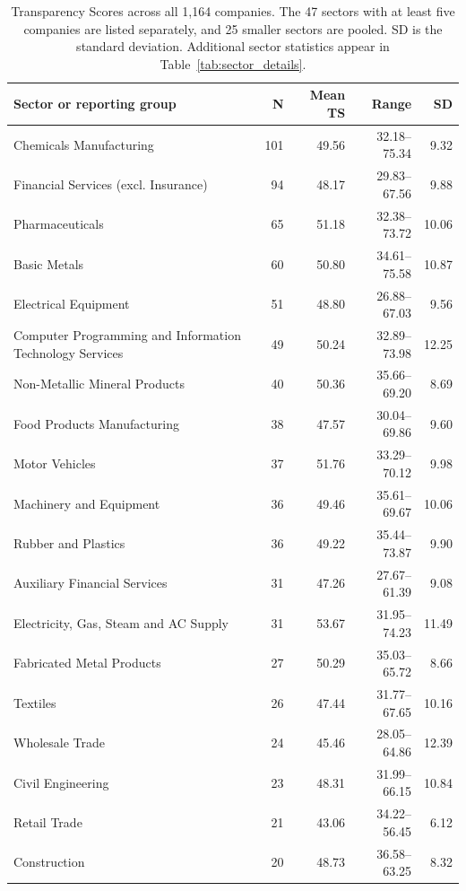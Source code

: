 \begin{table}[p]
\begin{singlepagetable}
\centering
\begingroup
\footnotesize
\setlength{\tabcolsep}{5pt}
\renewcommand{\arraystretch}{1.10}
\caption{Transparency Scores across all 1,164 companies. The 47 sectors with at least five companies are listed separately, and 25 smaller sectors are pooled. SD is the standard deviation. Additional sector statistics appear in Table~\ref{tab:sector_details}.}
\label{tab:all_sectors}
\begin{tabularx}{\linewidth}{@{}Yrrrr@{}}
\toprule\textbf{Sector or reporting group} & \textbf{N} & \textbf{Mean TS} & \textbf{Range} & \textbf{SD}\\\midrule
Chemicals Manufacturing & 101 & 49.56 & 32.18--75.34 & 9.32 \\
Financial Services (excl. Insurance) & 94 & 48.17 & 29.83--67.56 & 9.88 \\
Pharmaceuticals & 65 & 51.18 & 32.38--73.72 & 10.06 \\
Basic Metals & 60 & 50.80 & 34.61--75.58 & 10.87 \\
Electrical Equipment & 51 & 48.80 & 26.88--67.03 & 9.56 \\
Computer Programming and Information Technology Services & 49 & 50.24 & 32.89--73.98 & 12.25 \\
Non-Metallic Mineral Products & 40 & 50.36 & 35.66--69.20 & 8.69 \\
Food Products Manufacturing & 38 & 47.57 & 30.04--69.86 & 9.60 \\
Motor Vehicles & 37 & 51.76 & 33.29--70.12 & 9.98 \\
Machinery and Equipment & 36 & 49.46 & 35.61--69.67 & 10.06 \\
Rubber and Plastics & 36 & 49.22 & 35.44--73.87 & 9.90 \\
Auxiliary Financial Services & 31 & 47.26 & 27.67--61.39 & 9.08 \\
Electricity, Gas, Steam and AC Supply & 31 & 53.67 & 31.95--74.23 & 11.49 \\
Fabricated Metal Products & 27 & 50.29 & 35.03--65.72 & 8.66 \\
Textiles & 26 & 47.44 & 31.77--67.65 & 10.16 \\
Wholesale Trade & 24 & 45.46 & 28.05--64.86 & 12.39 \\
Civil Engineering & 23 & 48.31 & 31.99--66.15 & 10.84 \\
Retail Trade & 21 & 43.06 & 34.22--56.45 & 6.12 \\
Construction & 20 & 48.73 & 36.58--63.25 & 8.32 \\

\end{tabularx}
\end{singlepagetable}
\end{table}
